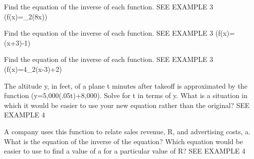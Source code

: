 \documentclass{article}
\newenvironment{practice}[2]{}{}        %
\newcommand{\answer}[1]{}               %
\newcommand{\placeholder}[2]{}          %
\begin{document}
\begin{practice}{24}{1}
Find the equation of the inverse of each function. SEE EXAMPLE 3
(f(x)=\log_2(8x))
\answer{(f^{-1}(x)=\frac{2^x}{8})}
\end{practice}
\begin{practice}{25}{2}
Find the equation of the inverse of each function. SEE EXAMPLE 3
(f(x)=\ln(x+3)-1)
\answer{(f^{-1}(x)=e^{x+1}-3)}
\end{practice}
\begin{practice}{26}{2}
Find the equation of the inverse of each function. SEE EXAMPLE 3
(f(x)=4\log_2(x-3)+2)
\answer{(f^{-1}(x)=2^{\frac{x-2}{4}}+3)}
\end{practice}
\begin{practice}{27}{2}
The altitude y, in feet, of a plane t minutes after takeoff is approximated by the function (y=5,000\ln(.05t)+8,000). Solve for t in terms of y. What is a situation in which it would be easier to use your new equation rather than the original? SEE EXAMPLE 4
\answer{(t=20e^{\frac{y-8,000}{5,000}}); Use this new equation when the altitude of the plane is known but the time since takeoff is not.}
\end{practice}
\begin{practice}{28}{3}
A company uses this function to relate sales revenue, R, and advertising costs, a. What is the equation of the inverse of the equation? Which equation would be easier to use to find a value of a for a particular value of R? SEE EXAMPLE 4
\placeholder{illustration}{Turquoise panel: Sales Revenue, R over stacks of gold coins at left; Advertising Costs, a over purple tablet and phone with ADS at right; purple arrow points from advertising to revenue. White equation card R=12 log(a+1)+25.}
\answer{The inverse of the formula is (a=10^{\frac{R-25}{12}}-1). It would be easier to use the inverse to find a when R is known.}
\end{practice}
\end{document}
